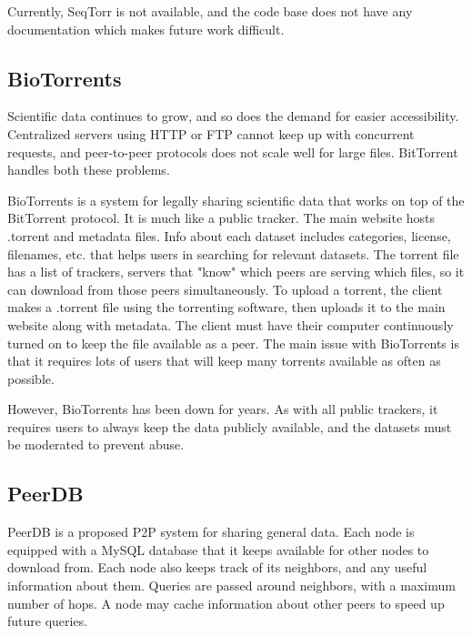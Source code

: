 \documentclass{article}
\begin{document}
Currently, SeqTorr is not available, and the code base does not have any documentation which makes future work difficult.



\subsection{BioTorrents}
Scientific data continues to grow, and so does the demand for easier accessibility. Centralized servers using HTTP or FTP cannot keep up with concurrent requests, and peer-to-peer protocols does not scale well for large files. BitTorrent handles both these problems.

BioTorrents is a system for legally sharing scientific data that works on top of the BitTorrent protocol. It is much like a public tracker. The main website hosts .torrent and metadata files. Info about each dataset includes categories, license, filenames, etc. that helps users in searching for relevant datasets. The torrent file has a list of trackers, servers that "know" which peers are serving which files, so it can download from those peers simultaneously. To upload a torrent, the client makes a .torrent file using the torrenting software, then uploads it to the main website along with metadata. The client must have their computer continuously turned on to keep the file available as a peer. The main issue with BioTorrents is that it requires lots of users that will keep many torrents available as often as possible.
\autocite{biotorrents}

However, BioTorrents has been down for years. As with all public trackers, it requires users to always keep the data publicly available, and the datasets must be moderated to prevent abuse.

\subsection{PeerDB}
PeerDB is a proposed P2P system for sharing general data. Each node is equipped with a MySQL database that it keeps available for other nodes to download from. Each node also keeps track of its neighbors, and any useful information about them. Queries are passed around neighbors, with a maximum number of hops. A node may cache information about other peers to speed up future queries.
\autocite{peerdb}

\end{document}
